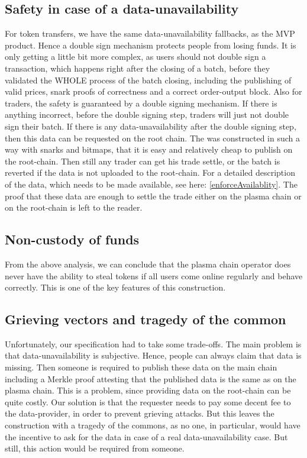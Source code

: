 \documentclass[11pt,parskip=full]{scrartcl}%
\begin{document}
\subsection{Safety in case of a data-unavailability}
For token transfers, we have the same data-unavailability fallbacks, as the MVP product. 
Hence a double sign mechanism protects people from losing funds. 
It is only getting a little bit more complex, as users should not double sign a transaction, which happens right after the closing of a batch, before they validated the WHOLE process of the batch closing, including the publishing of valid prices, snark proofs of correctness and a correct order-output block. 
Also for traders, the safety is guaranteed by a  double signing mechanism. 
If there is anything incorrect, before the double signing step, traders will just not double sign their batch. 
If there is any data-unavailability after the double signing step, then this data can be requested on the root chain. 
The was constructed in such a way with snarks and bitmaps, that it is easy and relatively cheap to publish on the root-chain. 
Then still any trader can get his trade settle, or the batch is reverted if the data is not uploaded to the root-chain. 
For a detailed description of the data, which needs to be made available, see here: \ref{enforceAvailablity}. 
The proof that these data are enough to settle the trade either on the plasma chain or on the root-chain is left to the reader. 

\subsection{Non-custody of funds}
From the above analysis, we can conclude that the plasma chain operator does never have the ability to steal tokens if all users come online regularly and behave correctly. 
This is one of the key features of this construction. 

\subsection{Grieving vectors and tragedy of the common}
Unfortunately, our specification had to take some trade-offs. 
The main problem is that data-unavailability is subjective. 
Hence, people can always claim that data is missing. 
Then someone is required to publish these data on the main chain including a Merkle proof attesting that the published data is the same as on the plasma chain. 
This is a problem, since providing data on the root-chain can be quite costly. 
Our solution is that the requester needs to pay some decent fee to the data-provider, in order to prevent grieving attacks. 
But this leaves the construction with a tragedy of the commons, as no one, in particular, would have the incentive to ask for the data in case of a real data-unavailability case. 
But still, this action would be required from someone. 
\end{document}

